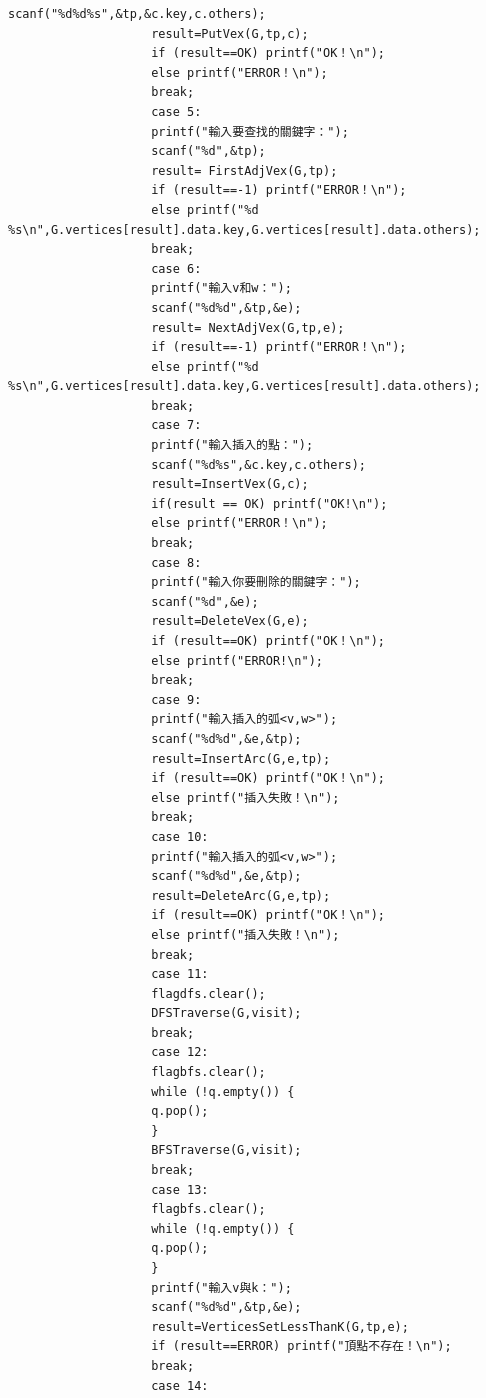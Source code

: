 \documentclass[supercite]{Experimental_Report}
\theoremstyle{definition}
\begin{document}
\begin{lstlisting}[style=commonCodeStyle, caption={目标程序}, label={lst:2-17}]
					scanf("%d%d%s",&tp,&c.key,c.others);                                                
					result=PutVex(G,tp,c);
					if (result==OK) printf("OK！\n");
					else printf("ERROR！\n");            
					break;
					case 5:
					printf("輸入要查找的關鍵字：");
					scanf("%d",&tp);
					result= FirstAdjVex(G,tp);
					if (result==-1) printf("ERROR！\n"); 
					else printf("%d %s\n",G.vertices[result].data.key,G.vertices[result].data.others);
					break;
					case 6:
					printf("輸入v和w：");
					scanf("%d%d",&tp,&e);
					result= NextAdjVex(G,tp,e);
					if (result==-1) printf("ERROR！\n"); 
					else printf("%d %s\n",G.vertices[result].data.key,G.vertices[result].data.others);          
					break;
					case 7:
					printf("輸入插入的點：");
					scanf("%d%s",&c.key,c.others);  
					result=InsertVex(G,c);   
					if(result == OK) printf("OK!\n");
					else printf("ERROR！\n");        
					break;                                      
					case 8:
					printf("輸入你要刪除的關鍵字：");
					scanf("%d",&e);
					result=DeleteVex(G,e);       
					if (result==OK) printf("OK！\n");
					else printf("ERROR!\n");
					break;
					case 9:                          
					printf("輸入插入的弧<v,w>");
					scanf("%d%d",&e,&tp);
					result=InsertArc(G,e,tp);    
					if (result==OK) printf("OK！\n");
					else printf("插入失敗！\n");
					break;
					case 10:                                             
					printf("輸入插入的弧<v,w>");
					scanf("%d%d",&e,&tp);
					result=DeleteArc(G,e,tp);    
					if (result==OK) printf("OK！\n");
					else printf("插入失敗！\n");
					break;
					case 11:
					flagdfs.clear();
					DFSTraverse(G,visit);		
					break;
					case 12:
					flagbfs.clear();
					while (!q.empty()) {
					q.pop(); 
					}
					BFSTraverse(G,visit);
					break;
					case 13:
					flagbfs.clear();
					while (!q.empty()) {
					q.pop(); 
					}
					printf("輸入v與k：");
					scanf("%d%d",&tp,&e);
					result=VerticesSetLessThanK(G,tp,e);
					if (result==ERROR) printf("頂點不存在！\n");                                          
					break;                                                                                  
					case 14:
									

\end{lstlisting}
\end{document}
